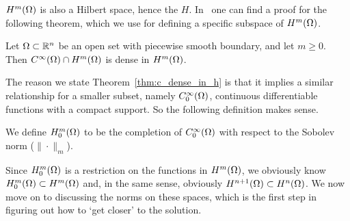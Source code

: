 $H^m(\Omega)$ is also a Hilbert space, hence the $H$.
In~\cite{Brezis} one can find a proof for the following theorem, which 
we use for defining a specific subspace of $H^m(\Omega)$.
\begin{thmx}{\quad}
   Let $\Omega \subset \mathbb{R}^n$ be an open set with piecewise smooth boundary, 
   and let $m \geq 0$. Then $C^\infty (\Omega) \cap H^m(\Omega)$ is dense in 
   $H^m(\Omega)$.\label{thm:c_dense_in_h}
\end{thmx}
The reason we state Theorem~\ref{thm:c_dense_in_h} is that it implies a 
similar relationship for a smaller subset, namely $C^\infty_0(\Omega)$, 
continuous differentiable functions with a compact support. So the following 
definition makes sense.
\begin{defn}{\quad}
  We define $H_0^m(\Omega)$ to be the completion of $C^\infty_0(\Omega)$ with respect 
  to the Sobolev norm
 ($\| \cdot \|_m$).
\end{defn} 
Since $H_0^m(\Omega)$ is a restriction on the functions in $H^m(\Omega)$, 
we obviously know $H_0^m(\Omega) \subset H^m(\Omega)$ and, in the same 
sense, obviously $H^{n+1}(\Omega) \subset H^n(\Omega)$.
We now move on to discussing the norms on these spaces, 
which is the first step in figuring out how to `get closer' to 
the solution.